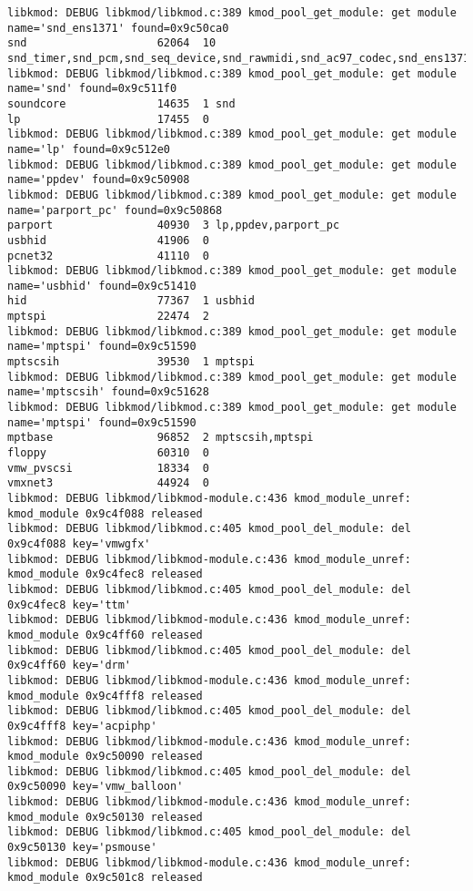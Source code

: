 \documentclass[11pt,a4paper]{article}
\begin{document}
{\begin{shaded}
\begin{verbatim}
libkmod: DEBUG libkmod/libkmod.c:389 kmod_pool_get_module: get module name='snd_ens1371' found=0x9c50ca0
snd                    62064  10 snd_timer,snd_pcm,snd_seq_device,snd_rawmidi,snd_ac97_codec,snd_ens1371
libkmod: DEBUG libkmod/libkmod.c:389 kmod_pool_get_module: get module name='snd' found=0x9c511f0
soundcore              14635  1 snd
lp                     17455  0 
libkmod: DEBUG libkmod/libkmod.c:389 kmod_pool_get_module: get module name='lp' found=0x9c512e0
libkmod: DEBUG libkmod/libkmod.c:389 kmod_pool_get_module: get module name='ppdev' found=0x9c50908
libkmod: DEBUG libkmod/libkmod.c:389 kmod_pool_get_module: get module name='parport_pc' found=0x9c50868
parport                40930  3 lp,ppdev,parport_pc
usbhid                 41906  0 
pcnet32                41110  0 
libkmod: DEBUG libkmod/libkmod.c:389 kmod_pool_get_module: get module name='usbhid' found=0x9c51410
hid                    77367  1 usbhid
mptspi                 22474  2 
libkmod: DEBUG libkmod/libkmod.c:389 kmod_pool_get_module: get module name='mptspi' found=0x9c51590
mptscsih               39530  1 mptspi
libkmod: DEBUG libkmod/libkmod.c:389 kmod_pool_get_module: get module name='mptscsih' found=0x9c51628
libkmod: DEBUG libkmod/libkmod.c:389 kmod_pool_get_module: get module name='mptspi' found=0x9c51590
mptbase                96852  2 mptscsih,mptspi
floppy                 60310  0 
vmw_pvscsi             18334  0 
vmxnet3                44924  0 
libkmod: DEBUG libkmod/libkmod-module.c:436 kmod_module_unref: kmod_module 0x9c4f088 released
libkmod: DEBUG libkmod/libkmod.c:405 kmod_pool_del_module: del 0x9c4f088 key='vmwgfx'
libkmod: DEBUG libkmod/libkmod-module.c:436 kmod_module_unref: kmod_module 0x9c4fec8 released
libkmod: DEBUG libkmod/libkmod.c:405 kmod_pool_del_module: del 0x9c4fec8 key='ttm'
libkmod: DEBUG libkmod/libkmod-module.c:436 kmod_module_unref: kmod_module 0x9c4ff60 released
libkmod: DEBUG libkmod/libkmod.c:405 kmod_pool_del_module: del 0x9c4ff60 key='drm'
libkmod: DEBUG libkmod/libkmod-module.c:436 kmod_module_unref: kmod_module 0x9c4fff8 released
libkmod: DEBUG libkmod/libkmod.c:405 kmod_pool_del_module: del 0x9c4fff8 key='acpiphp'
libkmod: DEBUG libkmod/libkmod-module.c:436 kmod_module_unref: kmod_module 0x9c50090 released
libkmod: DEBUG libkmod/libkmod.c:405 kmod_pool_del_module: del 0x9c50090 key='vmw_balloon'
libkmod: DEBUG libkmod/libkmod-module.c:436 kmod_module_unref: kmod_module 0x9c50130 released
libkmod: DEBUG libkmod/libkmod.c:405 kmod_pool_del_module: del 0x9c50130 key='psmouse'
libkmod: DEBUG libkmod/libkmod-module.c:436 kmod_module_unref: kmod_module 0x9c501c8 released

\end{verbatim}
\end{shaded}}
\end{document}
